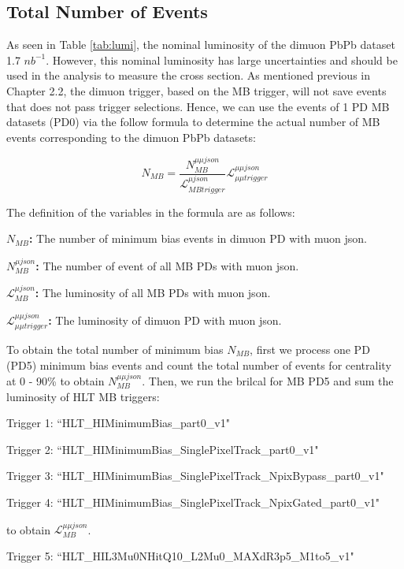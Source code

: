 \subsection{Total Number of Events}

As seen in Table \ref{tab:lumi}, the nominal luminosity of the dimuon PbPb dataset 1.7 $nb^{-1}$. However, this nominal luminosity has large uncertainties and should be used in the analysis to measure the cross section. As mentioned previous in Chapter 2.2, the dimuon trigger, based on the MB trigger, will not save events that does not pass trigger selections. Hence, we can use the events of 1 PD MB datasets (PD0) via the follow formula to determine the actual number of MB events corresponding to the dimuon PbPb datasets: 


\begin{equation}
N_{MB} = \frac{N^{\mu\mu json}_{MB}}{\mathcal{L}_{MB trigger}^{\mu json}} \mathcal{L}_{\mu\mu trigger}^{\mu\mu json}
\end{equation}

The definition of the variables in the formula are as follows:


\textbf{$N_{MB}$:} The number of minimum bias events in dimuon PD with muon json.

\textbf{$N^{\mu json}_{MB}$:} The number of event of all MB PDs with muon json. 

\textbf{$\mathcal{L}^{\mu json}_{MB}$:} The luminosity of all MB PDs with muon json.

\textbf{$\mathcal{L}_{\mu\mu trigger}^{\mu\mu json}$:} The luminosity of dimuon PD with muon json.

\iffalse 

To obtain the total number of minimum bias $N_{MB}$, first we process one PD (PD5) minimum bias events and count the total number of events for centrality at 0 - 90\% to obtain $N^{\mu\mu json}_{MB}$. Then, we run the brilcal for MB PD5 and sum the luminosity of HLT MB triggers: 

Trigger 1: ``HLT\_HIMinimumBias\_part0\_v1" 
 
Trigger 2: ``HLT\_HIMinimumBias\_SinglePixelTrack\_part0\_v1"
 
Trigger 3: ``HLT\_HIMinimumBias\_SinglePixelTrack\_NpixBypass\_part0\_v1" 
  
Trigger 4: ``HLT\_HIMinimumBias\_SinglePixelTrack\_NpixGated\_part0\_v1" 
 
to obtain $\mathcal{L}^{\mu\mu json}_{MB}$. 

Trigger 5: ``HLT\_HIL3Mu0NHitQ10\_L2Mu0\_MAXdR3p5\_M1to5\_v1" 

